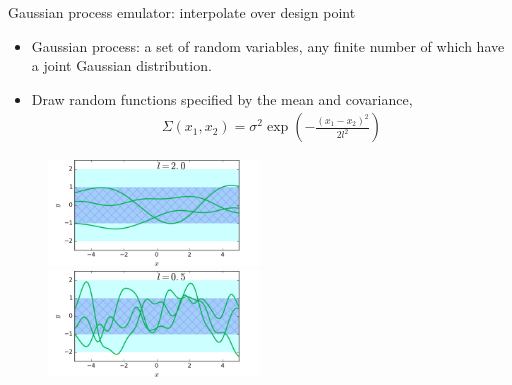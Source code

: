 \documentclass[11pt]{beamer}
\begin{document}
\begin{frame}{Gaussian process emulator: interpolate over design point}
\begin{itemize}
\item Gaussian process: a set of random variables, any finite number of which have a joint Gaussian distribution.
\item Draw random functions specified by the mean and covariance,
\begin{eqnarray}
\Sigma(x_1, x_2) = \sigma^2 \exp\left(-\frac{\left(x_1 - x_2\right)^2}{2l^2}\right)
\end{eqnarray}
\end{itemize}
\begin{center}
\begin{figure}
\includegraphics[width = 0.5\textwidth]{./pics/GP-1.png}
\includegraphics[width = 0.5\textwidth]{./pics/GP-11.png}
\end{figure}
\end{center}
\end{frame}
\end{document}
